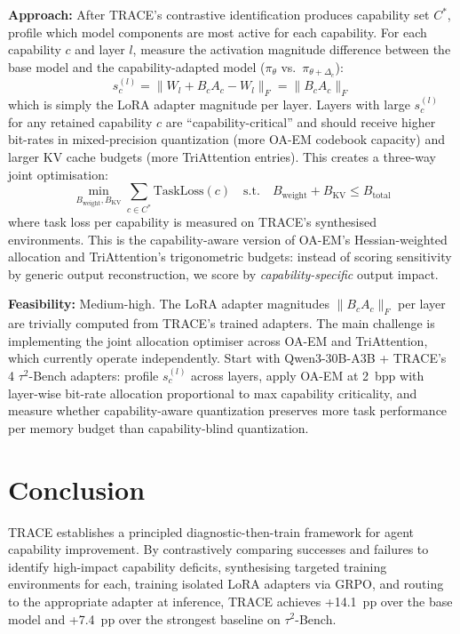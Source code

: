 \documentclass[11pt]{article}
\begin{document}
\textbf{Approach:} After TRACE's contrastive identification produces capability set $C^{*}$, profile which model components are most active for each capability. For each capability $c$ and layer $l$, measure the activation magnitude difference between the base model and the capability-adapted model ($\pi_\theta$ vs.\ $\pi_{\theta + \Delta_c}$):
\begin{equation}
    s_{c}^{(l)} = \|W_l + B_{c} A_{c} - W_l\|_{F} = \|B_{c} A_{c}\|_{F}
\end{equation}
which is simply the LoRA adapter magnitude per layer. Layers with large $s_{c}^{(l)}$ for any retained capability $c$ are ``capability-critical'' and should receive higher bit-rates in mixed-precision quantization (more OA-EM codebook capacity) and larger KV cache budgets (more TriAttention entries). This creates a three-way joint optimisation:
\begin{equation}
    \min_{B_{\mathrm{weight}}, B_{\mathrm{KV}}} \sum_{c \in C^{*}} \mathrm{TaskLoss}(c) \quad \mathrm{s.t.} \quad B_{\mathrm{weight}} + B_{\mathrm{KV}} \leq B_{\mathrm{total}}
\end{equation}
where task loss per capability is measured on TRACE's synthesised environments. This is the capability-aware version of OA-EM's Hessian-weighted allocation and TriAttention's trigonometric budgets: instead of scoring sensitivity by generic output reconstruction, we score by \textit{capability-specific} output impact.

\textbf{Feasibility:} Medium-high. The LoRA adapter magnitudes $\|B_c A_c\|_{F}$ per layer are trivially computed from TRACE's trained adapters. The main challenge is implementing the joint allocation optimiser across OA-EM and TriAttention, which currently operate independently. Start with Qwen3-30B-A3B + TRACE's 4 $\tau^{2}$-Bench adapters: profile $s_{c}^{(l)}$ across layers, apply OA-EM at 2~bpp with layer-wise bit-rate allocation proportional to max capability criticality, and measure whether capability-aware quantization preserves more task performance per memory budget than capability-blind quantization.

\section{Conclusion}

TRACE establishes a principled diagnostic-then-train framework for agent capability improvement. By contrastively comparing successes and failures to identify high-impact capability deficits, synthesising targeted training environments for each, training isolated LoRA adapters via GRPO, and routing to the appropriate adapter at inference, TRACE achieves +14.1~pp over the base model and +7.4~pp over the strongest baseline on $\tau^{2}$-Bench.
\end{document}
